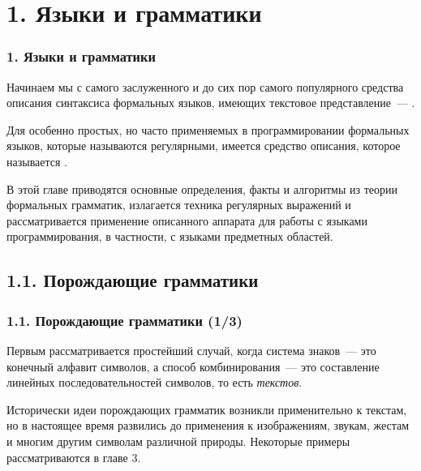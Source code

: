 \section{1. Языки и грамматики}\label{1.}
\begin{frame}
\frametitle{1. Языки и грамматики }

Начинаем мы с самого заслуженного и 
до сих пор самого популярного средства описания синтаксиса формальных языков, имеющих текстовое представление~---
 .


\medskip
Для особенно простых, но часто применяемых в программировании
формальных языков, которые называются регулярными,
имеется средство описания, которое называется
.

\medskip
В этой главе приводятся основные определения, факты и алгоритмы из
теории формальных грамматик, излагается техника регулярных выражений
и рассматривается применение описанного аппарата для работы
с языками программирования, в частности,
с языками предметных областей.

\end{frame}


\subsection{1.1. Порождающие грамматики}
\label{1.1.}
\begin{frame}
\frametitle{1.1. Порождающие грамматики (1/3)}
Первым рассматривается простейший случай, когда система знаков~--- это
конечный алфавит символов, а способ
комбинирования~--- это составление линейных последовательностей
символов, то есть {\em текстов}.

\bigskip
\begin{digress}
Исторически идеи порождающих грамматик возникли 
применительно к текстам, но в настоящее время
развились до применения к изображениям, звукам, жестам и многим 
другим символам различной природы. 
Некоторые примеры рассматриваются в главе 3.  
\end{digress}
\end{frame}

